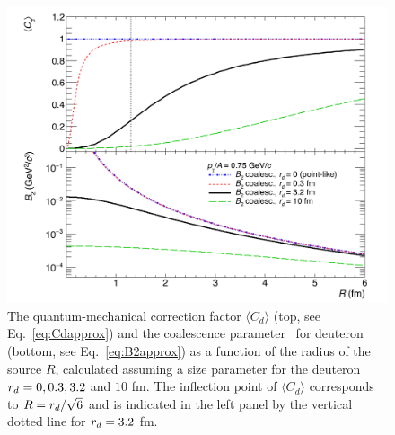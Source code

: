 \documentclass[%
 reprint,
 amsmath,amssymb,
 aps,
]{revtex4-1}
\begin{document}
\begin{figure}[hb]
\begin{center}
\includegraphics[width=\columnwidth]{theory_coalescence_Cd_B2_vert.png}
\caption{{The quantum-mechanical correction factor $\langle C_{d} \rangle$ (top, see Eq.~\ref{eq:Cdapprox}) and the coalescence parameter \btwo~for deuteron (bottom, see Eq.~\ref{eq:B2approx}) as a function of the radius of the source $R$, calculated assuming a size parameter for the deuteron $r_{d} = 0, 0.3, 3.2$ and $10$ fm. The inflection point of $\langle C_{d} \rangle$ corresponds to $R = r_{d}/\sqrt{6}$ and is indicated in the left panel by the vertical dotted line for $r_{d} = 3.2$ fm.}}
\label{fig:radiusDependence}
\end{center}
\end{figure}   
\end{document}
